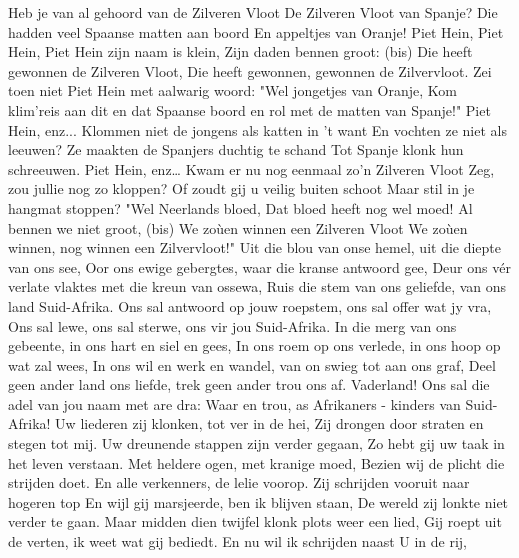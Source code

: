 \documentclass{article}
\begin{document}
\begin{songs}{}
\begin{intersong}
\end{intersong}
\beginverse*
Heb je van al gehoord van de Zilveren Vloot
De Zilveren Vloot van Spanje?
Die hadden veel Spaanse matten aan boord
En appeltjes van Oranje!
Piet Hein, Piet Hein,
Piet Hein zijn naam is klein,
Zijn daden bennen groot: (bis)
Die heeft gewonnen de Zilveren Vloot,
Die heeft gewonnen, gewonnen de Zilvervloot.
\endverse
\beginverse*
Zei toen niet Piet Hein met aalwarig woord:
"Wel jongetjes van Oranje,
Kom klim'reis aan dit en dat Spaanse boord
en rol met de matten van Spanje!"
Piet Hein, enz...
\endverse
\beginverse*
Klommen niet de jongens als katten in 't want
En vochten ze niet als leeuwen?
Ze maakten de Spanjers duchtig te schand
Tot Spanje klonk hun schreeuwen.
Piet Hein, enz…
\endverse
\beginverse*
Kwam er nu nog eenmaal zo'n Zilveren Vloot
Zeg, zou jullie nog zo kloppen?
Of zoudt gij u veilig buiten schoot
Maar stil in je hangmat stoppen?
"Wel Neerlands bloed,
Dat bloed heeft nog wel moed!
Al bennen we niet groot, (bis)
We zoùen winnen een Zilveren Vloot
We zoùen winnen, nog winnen een Zilvervloot!"
\endverse
\endsong
{}
\beginverse*
Uit die blou van onse hemel, uit die diepte van ons see,
Oor ons ewige gebergtes, waar die kranse antwoord gee,
Deur ons vér verlate vlaktes met die kreun van ossewa,
Ruis die stem van ons geliefde, van ons land Suid-Afrika.
Ons sal antwoord op jouw roepstem, ons sal offer wat jy vra,
Ons sal lewe, ons sal sterwe, ons vir jou Suid-Afrika.
\endverse
\beginverse*
In die merg van ons gebeente, in ons hart en siel en gees,
In ons roem op ons verlede, in ons hoop op wat zal wees,
In ons wil en werk en wandel, van on swieg tot aan ons graf,
Deel geen ander land ons liefde, trek geen ander trou ons af.
Vaderland! Ons sal die adel van jou naam met are dra:
Waar en trou, as Afrikaners - kinders van Suid-Afrika!
\endverse
\endsong 
{}
\beginverse*
Uw liederen zij klonken, tot ver in de hei,
Zij drongen door straten en stegen tot mij.
Uw dreunende stappen zijn verder gegaan,
Zo hebt gij uw taak in het leven verstaan.
\endverse
\beginchorus
Met heldere ogen, met kranige moed,
Bezien wij de plicht die strijden doet.
En alle verkenners, de lelie voorop.
Zij schrijden vooruit naar hogeren top
\endchorus
\beginverse*
En wijl gij marsjeerde, ben ik blijven staan,
De wereld zij lonkte niet verder te gaan.
Maar midden dien twijfel klonk plots weer een lied,
Gij roept uit de verten, ik weet wat gij bediedt.
\endverse
\beginverse*
En nu wil ik schrijden naast U in de rij,

\end{songs}
\end{document}
